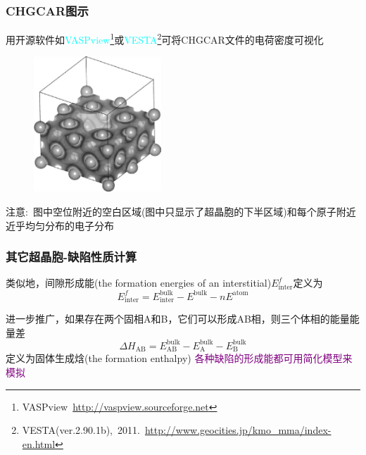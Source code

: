 \frame
{
	\frametitle{\textrm{CHGCAR}图示}
	用开源软件如\textcolor{cyan}{\textrm{VASPview}}\footnote{\textrm{VASPview~\url{http://vaspview.sourceforge.net}}}或\textcolor{cyan}{\textrm{VESTA}}\footnote{\textrm{VESTA(ver.2.90.1b),~2011.~\url{http://www.geocities.jp/kmo\_mma/index-en.html}}}可将\textrm{CHGCAR}文件的电荷密度可视化%
\begin{figure}[h!]
\centering
\includegraphics[height=2.0in,viewport=0 0 640 660,clip]{Figures/Pt_vacancy-CHGCAR.png}
\caption{\fontsize{6.2pt}{5.2pt}}%
\label{Pt_vacancy-Density}
\end{figure}

注意:~图中空位附近的空白区域(图中只显示了超晶胞的下半区域)和每个原子附近近乎均匀分布的电子分布
}

\frame
{
	\frametitle{其它超晶胞-缺陷性质计算}

类似地，间隙形成能\textrm{(the formation energies of an interstitial)}$E_{\mathrm{inter}}^f$定义为
\begin{displaymath}
	E_{\mathrm{inter}}^f=E_{\mathrm{inter}}^{\mathrm{bulk}}-E^{\mathrm{bulk}}-nE^{\mathrm{atom}}
\end{displaymath}
{\fontsize{6.2pt}{5.2pt}}

进一步推广，如果存在两个固相\textrm{A}和{B}，它们可以形成\textrm{AB}相，则三个体相的能量能量差
\begin{displaymath}
	\Delta H_{\mathrm{AB}}=E_{\mathrm{AB}}^{\mathrm{bulk}}-E_{\mathrm{A}}^{\mathrm{bulk}}-E_{\mathrm{B}}^{\mathrm{bulk}}
\end{displaymath}
定义为固体生成焓\textrm{(the formation enthalpy)}
\vskip 5pt
\textcolor{purple}{各种缺陷的形成能都可用简化模型来模拟}\\
{\fontsize{7.0pt}{5.2pt}\selectfont{用户在构造包含缺陷的超晶胞时，必须切记，超晶胞要设计得足够大，确保缺陷间的相互作用足够小}}
}

